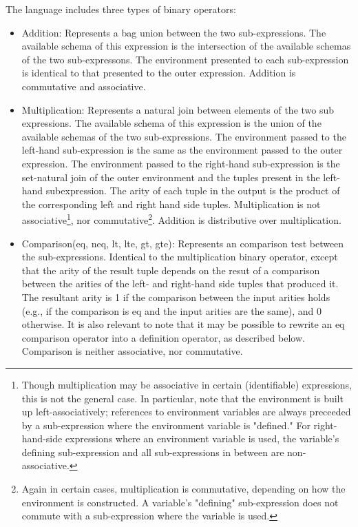\documentclass[11pt]{amsart}
\begin{document}
The language includes three types of binary operators:
\begin{itemize}
\item Addition: Represents a bag union between the two sub-expressions. The available schema of this expression is the intersection of the available schemas of the two sub-expressons.  The environment presented to each sub-expression is identical to that presented to the outer expression.  Addition is commutative and associative.
\item Multiplication: Represents a natural join between elements of the two sub expressions.  The available schema of this expression is the union of the available schemas of the two sub-expressions.  The environment passed to the left-hand sub-expression is the same as the environment passed to the outer expression.  The environment passed to the right-hand sub-expression is the set-natural join of the outer environment and the tuples present in the left-hand subexpression.  The arity of each tuple in the output is the product of the corresponding left and right hand side tuples.  Multiplication is not associative\footnote{Though multiplication may be associative in certain (identifiable) expressions, this is not the general case.  In particular, note that the environment is built up left-associatively; references to environment variables are always preceeded by a sub-expression where the environment variable is "defined."  For right-hand-side expressions where an environment variable is used, the variable's defining sub-expression and all sub-expressions in between are non-associative.}, nor commutative\footnote{Again in certain cases, multiplication is commutative, depending on how the environment is constructed.  A variable's "defining" sub-expression does not commute with a sub-expression where the variable is used.}.  Addition is distributive over multiplication.
\item Comparison(eq, neq, lt, lte, gt, gte): Represents an comparison test between the sub-expressions.  Identical to the multiplication binary operator, except that the arity of the result tuple depends on the resut of a comparison between the arities of the left- and right-hand side tuples that produced it.  The resultant arity is 1 if the comparison between the input arities holds (e.g., if the comparison is eq and the input arities are the same), and 0 otherwise.  It is also relevant to note that it may be possible to rewrite an eq comparison operator into a  definition operator, as described below.  Comparison is neither associative, nor commutative.
\end{itemize}
\end{document}

